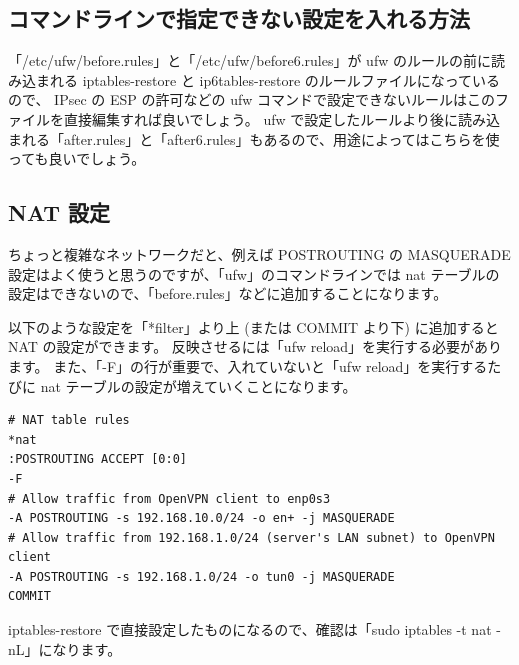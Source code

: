 \documentclass[mingoth,a4paper]{jsarticle}
\begin{document}
\subsection{コマンドラインで指定できない設定を入れる方法}

「/etc/ufw/before.rules」と「/etc/ufw/before6.rules」が ufw のルールの前に読み込まれる iptables-restore と ip6tables-restore のルールファイルになっているので、
IPsec の ESP の許可などの ufw コマンドで設定できないルールはこのファイルを直接編集すれば良いでしょう。
ufw で設定したルールより後に読み込まれる「after.rules」と「after6.rules」もあるので、用途によってはこちらを使っても良いでしょう。

\subsection{NAT 設定}

ちょっと複雑なネットワークだと、例えば POSTROUTING の MASQUERADE 設定はよく使うと思うのですが、「ufw」のコマンドラインでは nat テーブルの設定はできないので、「before.rules」などに追加することになります。

以下のような設定を「*filter」より上 (または COMMIT より下) に追加すると NAT の設定ができます。
反映させるには「ufw reload」を実行する必要があります。
また、「-F」の行が重要で、入れていないと「ufw reload」を実行するたびに nat テーブルの設定が増えていくことになります。

\begin{verbatim}
# NAT table rules
*nat
:POSTROUTING ACCEPT [0:0]
-F
# Allow traffic from OpenVPN client to enp0s3
-A POSTROUTING -s 192.168.10.0/24 -o en+ -j MASQUERADE
# Allow traffic from 192.168.1.0/24 (server's LAN subnet) to OpenVPN client
-A POSTROUTING -s 192.168.1.0/24 -o tun0 -j MASQUERADE
COMMIT
\end{verbatim}

iptables-restore で直接設定したものになるので、確認は「sudo iptables -t nat -nL」になります。
\end{document}
